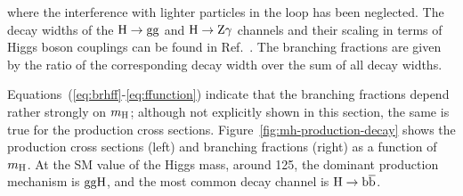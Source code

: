 % 
where the interference with lighter particles in the loop has been neglected.
% 
The decay widths of the $\mathrm{H}\to\mathrm{g}\mathrm{g}$ and $\mathrm{H}\to\mathrm{Z}\mathrm{\gamma}$ channels and their scaling in terms of Higgs boson couplings can be found in Ref.~\cite{higgshunter}.
% 
The branching fractions are given by the ratio of the corresponding decay width over the sum of all decay widths.


Equations~(\ref{eq:brhff}-\ref{eq:ffunction}) indicate that the branching fractions depend rather strongly on $m_{\mathrm{H}}$; although not explicitly shown in this section, the same is true for the production cross sections.
% 
Figure~\ref{fig:mh-production-decay} shows the production cross sections (left) and branching fractions (right) as a function of $m_{\mathrm{H}}$.
% 
At the SM value of the Higgs mass, around 125\GeV, the dominant production mechanism is $\mathrm{g}\mathrm{g}\mathrm{H}$, and the most common decay channel is $\mathrm{H}\to\mathrm{b}\overline{\mathrm{b}}$.

